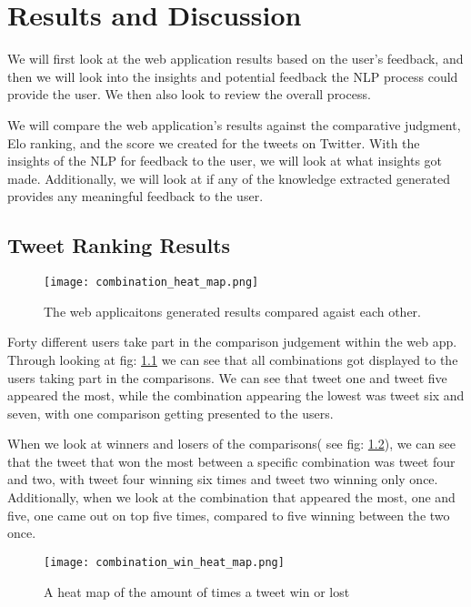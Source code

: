 \chapter{Results and Discussion}
\label{chap:results}

We will first look at the web application results based on the user's feedback, and then we will look into the insights and potential feedback the NLP process could provide the user. We then also look to review the overall process. 

We will compare the web application's results against the comparative judgment, Elo ranking, and the score we created for the tweets on Twitter. With the insights of the NLP for feedback to the user, we will look at what insights got made. Additionally, we will look at if any of the knowledge extracted generated provides any meaningful feedback to the user.



\section{Tweet Ranking Results} 
\label{sec:reaults_ranking}

\begin{figure}[h]
	\centering
	\texttt{[image: combination\_heat\_map.png]}
	\caption{The web applicaitons generated results compared agaist each other.}
	\label{fig:combinations}
	
\end{figure}

Forty different users take part in the comparison judgement within the web app. Through looking at fig: \ref{fig:combinations} we can see that all combinations got displayed to the users taking part in the comparisons. We can see that tweet one and tweet five appeared the most, while the combination appearing the lowest was tweet six and seven, with one comparison getting presented to the users.



When we look at winners and losers of the comparisons( see fig: \ref{fig:combination_wins}), we can see that the tweet that won the most between a specific combination was tweet four and two, with tweet four winning six times and tweet two winning only once. Additionally, when we look at the combination that appeared the most, one and five, one came out on top five times, compared to five winning between the two once.
\begin{figure}[h]
	\centering
	\texttt{[image: combination\_win\_heat\_map.png]}
	\caption{A heat map of the amount of times a tweet win or lost}
	\label{fig:combination_wins}
	
\end{figure}

